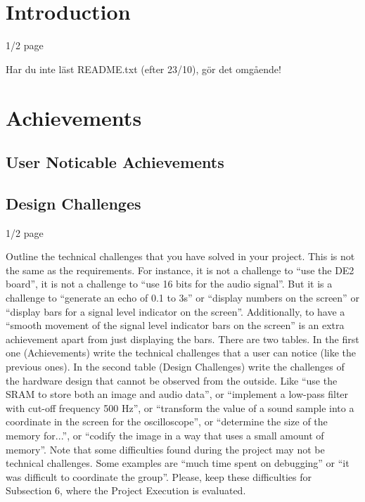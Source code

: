 \pagestyle{plain}
\setcounter{page}{1}

\section{Introduction}\label{cha:intro}

1/2 page

{\LARGE Har du inte läst README.txt (efter 23/10), gör det omgående!}

\section{Achievements}\label{cha:achievements}
\subsection{User Noticable Achievements}\label{sec:userachievments}

\subsection{Design Challenges}\label{sec:designchallenges}

1/2 page

Outline the technical challenges that you have solved in your project. This is not the same as the requirements. For instance, it is not a challenge to “use the DE2 board”, it is not a challenge to “use 16 bits for the audio signal”. But it is a challenge to “generate an echo of 0.1 to 3s” or “display numbers on the screen” or “display bars for a signal level indicator on the screen”. Additionally, to have a “smooth movement of the signal level indicator bars on the screen” is an extra achievement apart from just displaying the bars. There are two tables. In the first one (Achievements) write the technical challenges that a user can notice (like the previous ones). In the second table (Design Challenges) write the challenges of the hardware design that cannot be observed from the outside. Like “use the SRAM to store both an image and audio data”, or “implement a low-pass filter with cut-off frequency 500 Hz”, or “transform the value of a sound sample into a coordinate in the screen for the oscilloscope”, or “determine the size of the memory for...”, or “codify the image in a way that uses a small amount of memory”. Note that some difficulties found during the project may not be technical challenges. Some examples are “much time spent on debugging” or “it was difficult to coordinate the group”. Please, keep these difficulties for Subsection 6, where the Project Execution is evaluated.

